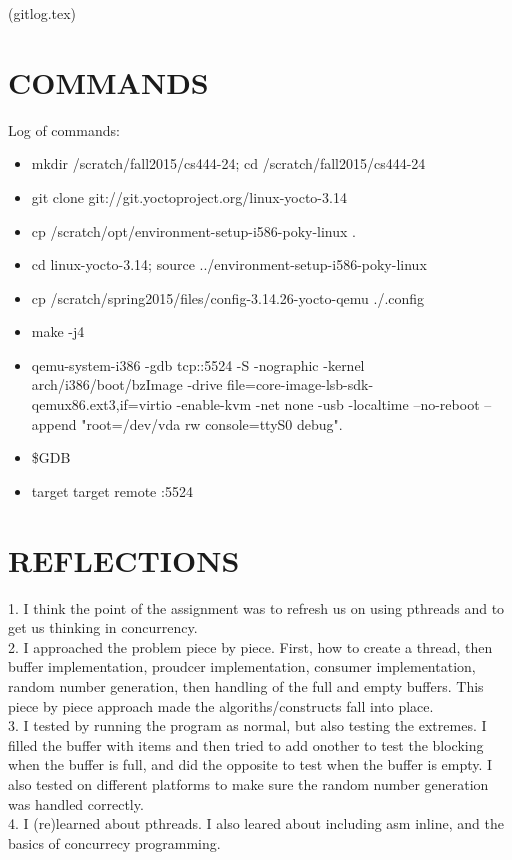 \documentclass[letterpaper,10pt,titlepage]{article}
\begin{document}
(gitlog.tex)

\section{COMMANDS}
Log of commands:\\
    \begin{itemize}
        \item mkdir /scratch/fall2015/cs444-24; cd /scratch/fall2015/cs444-24\\
        \item git clone git://git.yoctoproject.org/linux-yocto-3.14\\
        \item cp /scratch/opt/environment-setup-i586-poky-linux .\\
        \item cd linux-yocto-3.14; source ../environment-setup-i586-poky-linux\\
        \item cp /scratch/spring2015/files/config-3.14.26-yocto-qemu ./.config\\
        \item make -j4\\
        \item qemu-system-i386 -gdb tcp::5524 -S -nographic -kernel arch/i386/boot/bzImage -drive file=core-image-lsb-sdk-qemux86.ext3,if=virtio -enable-kvm -net none -usb -localtime --no-reboot --append "root=/dev/vda rw console=ttyS0 debug".\\
        \item \$GDB
        \item target target remote :5524
    \end{itemize}

\section{REFLECTIONS}
    1. I think the point of the assignment was to refresh us on using pthreads and to get us thinking in concurrency.\\
    2. I approached the problem piece by piece. First, how to create a thread, then buffer implementation, proudcer implementation, consumer implementation, random number generation, then handling of the full and empty buffers. This piece by piece approach made the algoriths/constructs fall into place.\\
    3. I tested by running the program as normal, but also testing the extremes. I filled the buffer with items and then tried to add onother to test the blocking when the buffer is full, and did the opposite to test when the buffer is empty. I also tested on different platforms to make sure the random number generation was handled correctly. \\
    4. I (re)learned about pthreads. I also leared about including asm inline, and the basics of concurrecy programming.\\ 


\end{document}

